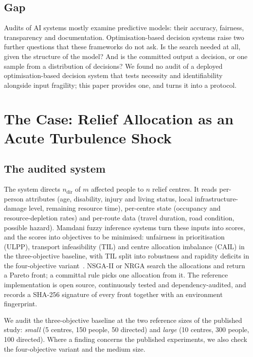\documentclass[systems,article,submit,moreauthors,pdftex]{Definitions/mdpi}
\begin{document}
\subsection{Gap}
Audits of AI systems mostly examine predictive models: their accuracy, fairness,
transparency and documentation. Optimisation-based decision systems raise two further
questions that these frameworks do not ask. Is the search needed at all, given the
structure of the model? And is the committed output a decision, or one sample from a
distribution of decisions? We found no audit of a deployed optimisation-based decision
system that tests necessity and identifiability alongside input fragility; this paper
provides one, and turns it into a protocol.

\section{The Case: Relief Allocation as an Acute Turbulence Shock}\label{sec:case}

\subsection{The audited system}
The system directs $n_{\mathrm{dir}}$ of $m$ affected people to $n$ relief centres. It
reads per-person attributes (age, disability, injury and living status, local
infrastructure-damage level, remaining resource time), per-centre state (occupancy and
resource-depletion rates) and per-route data (travel duration, road condition, possible
hazard). Mamdani fuzzy inference systems turn these inputs into scores, and the scores
into objectives to be minimised: unfairness in prioritisation (ULPP), transport
infeasibility (TIL) and centre allocation imbalance (CAIL) in the three-objective
baseline, with TIL split into robustness and rapidity deficits in the four-objective
variant~\cite{rabiei2026resilient}. NSGA-II or NRGA search the allocations and return a
Pareto front; a committal rule picks one allocation from it. The reference
implementation is open source, continuously tested and dependency-audited, and records a
SHA-256 signature of every front together with an environment fingerprint.

We audit the three-objective baseline at the two reference sizes of the published study:
\emph{small} (5 centres, 150 people, 50 directed) and \emph{large} (10 centres, 300
people, 100 directed). Where a finding concerns the published experiments, we also check
the four-objective variant and the medium size.
\end{document}
